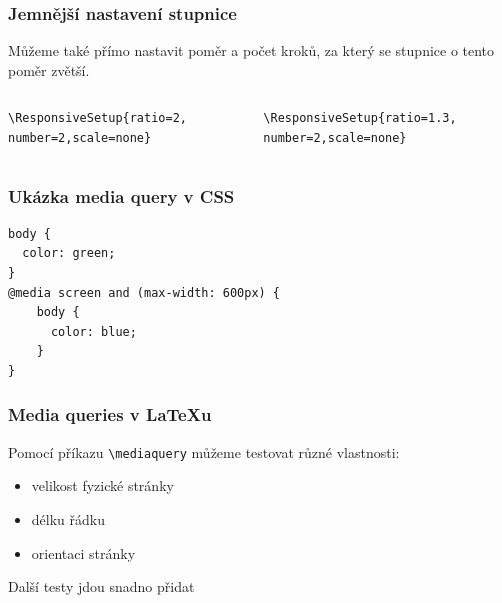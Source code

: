 \begin{frame}[fragile]
  \frametitle{Jemnější nastavení stupnice}

  Můžeme také přímo nastavit poměr a počet kroků, za který se stupnice o tento poměr zvětší.

\begin{columns}
  \begin{column}{0.5\textwidth}
\begin{verbatim}
\ResponsiveSetup{ratio=2,
number=2,scale=none}
\end{verbatim}
\end{column}
  \begin{column}{0.5\textwidth}
\begin{verbatim}
\ResponsiveSetup{ratio=1.3,
number=2,scale=none}
\end{verbatim}
\end{column}
\end{columns}

\end{frame}

\begin{frame}[fragile]
\frametitle{Ukázka media query v CSS}
\begin{verbatim}
body {
  color: green;
}
@media screen and (max-width: 600px) {
    body {
      color: blue;
    }
}
\end{verbatim}
          
\end{frame}

\begin{frame}[fragile]
  \frametitle{Media queries v \LaTeX u}
    Pomocí příkazu \verb|\mediaquery| můžeme testovat různé vlastnosti:
  
    \begin{itemize}
  \item velikost fyzické stránky
  \item délku řádku
  \item orientaci stránky
\end{itemize}

Další testy jdou snadno přidat

\end{frame}

